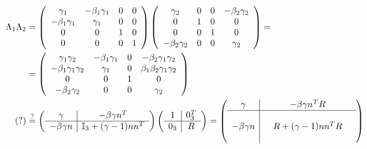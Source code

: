 \documentclass[12pt,a4paper,titlepage, twoside, openright]{book}
\numberwithin{equation}{chapter}
\begin{document}
\begin{align*}
\Lambda_1\Lambda_2 &=
\left(\begin{array}{cccc}
\gamma_1 & -\beta_1\gamma_1 & 0 & 0 \\
-\beta_1\gamma_1 & \gamma_1 & 0 & 0 \\
0 & 0 & 1 & 0 \\
0 & 0 & 0 & 1 \\
\end{array}\right)
\left(\begin{array}{cccc}
\gamma_2 & 0 & 0 & -\beta_2\gamma_2 \\
0 & 1 & 0 & 0 \\
0 & 0 & 1 & 0 \\
-\beta_2\gamma_2 & 0 & 0 & \gamma_2 \\
\end{array}\right) = \\ &=
\left(\begin{array}{cccc}
\gamma_1\gamma_2 & -\beta_1\gamma_1 & 0 & -\beta_2\gamma_1\gamma_2 \\
-\beta_1\gamma_1\gamma_2 & \gamma_1 & 0 & \beta_1\beta_2\gamma_1\gamma_2 \\
0 & 0 & 1 & 0 \\
-\beta_2\gamma_2 & 0 & 0 & \gamma_2 \\
\end{array}\right) \\
(?) &\overset{?}{=} 
\left(\begin{array}{c|c}
\gamma &-\beta\gamma n^T\\
\hline
-\beta\gamma n & \mathbb{I}_3 + (\gamma -1)n n^T \\
\end{array}\right)
\left(\begin{array}{c|c}
1 & 0_3^T \\
\hline
0_3  & R \\
\end{array}\right)=
\left(\begin{array}{c|ccc}
\gamma &  & -\beta\gamma n^T R &  \\
\hline
 & & & \\
-\beta\gamma n & & R+(\gamma -1)n n^T R & \\
 & & & \\
\end{array}\right)
\end{align*}
\end{document}
